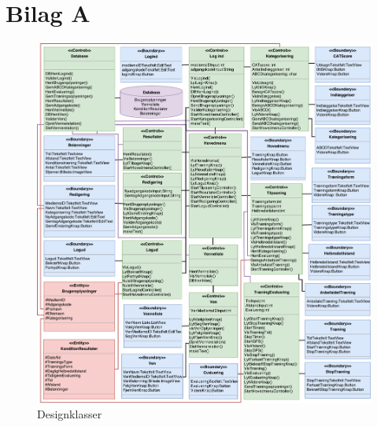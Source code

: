 \section{Bilag A} \label{bilagA}


\begin{figure} [H]
\centering
\includegraphics[width=1\textwidth]{figures/MVC/Designklasse}
\caption{Designklasser}
\label{fig:Designklasser}
\end{figure}